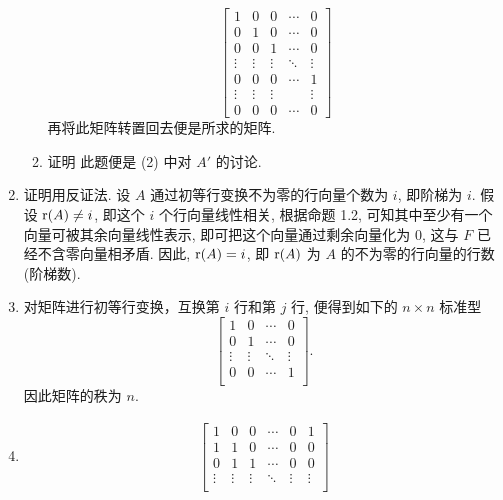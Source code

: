 \begin{enumerate}
\begin{enumerate}[(1)]
\[                    \begin{bmatrix}
                        1 & 0 & 0 & \cdots & 0 \\
                        0 & 1 & 0 & \cdots & 0 \\
                        0 & 0 & 1 & \cdots & 0 \\
                        \vdots & \vdots & \vdots & \ddots & \vdots \\
                        0 & 0 & 0 & \cdots & 1 \\
                        \vdots & \vdots & \vdots &  & \vdots \\
                        0 & 0 & 0 & \cdots & 0
                    \end{bmatrix}    
                \]
                再将此矩阵转置回去便是所求的矩阵.
            \item %
                {\heiti 证明} 此题便是 (2) 中对 $A'$ 的讨论.
        \end{enumerate}
    \item %
        {\heiti 证明}\quad 用反证法. 设 $A$ 通过初等行变换不为零的行向量个数为 $i$, 即阶梯为 $i$. 假设 $\mathrm{r}(A) \neq i$, 即这个 $i$ 个行向量线性相关,
        根据命题 1.2, 可知其中至少有一个向量可被其余向量线性表示, 即可把这个向量通过剩余向量化为 $0$, 这与 $F$ 已经不含零向量相矛盾.
        因此, $\mathrm{r}(A) = i$, 即 $\mathrm{r}(A)$ 为 $A$ 的不为零的行向量的行数 (阶梯数).
    \item %
        对矩阵进行初等行变换，互换第 $i$ 行和第 $j$ 行, 便得到如下的 $n \times n$ 标准型
        \[
            \begin{bmatrix}
                1 & 0 & \cdots & 0 \\
                0 & 1 & \cdots & 0 \\
                \vdots & \vdots & \ddots & \vdots \\
                0 & 0 & \cdots & 1 \\
            \end{bmatrix}.    
        \]
        因此矩阵的秩为 $n$.
    \item %
        \begin{gather*}
            \begin{bmatrix}
                1 & 0 & 0 & \cdots & 0 & 1 \\
                1 & 1 & 0 & \cdots & 0 & 0 \\
                0 & 1 & 1 & \cdots & 0 & 0 \\
                \vdots & \vdots & \vdots & \ddots & \vdots & \vdots \\

\end{bmatrix}
\end{gather*}
\end{enumerate}
